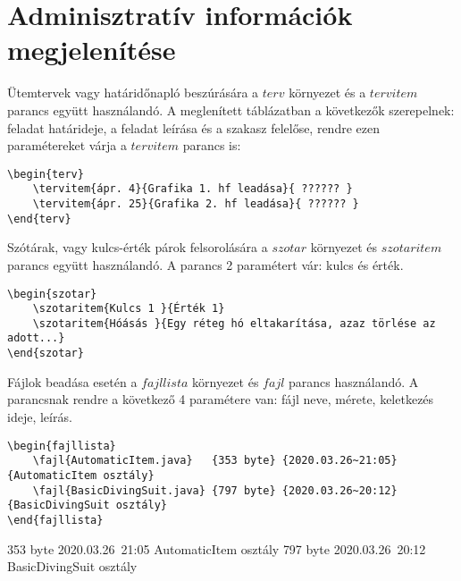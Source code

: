 \documentclass[]{article}
\begin{document}
\section{Adminisztratív információk megjelenítése}
Ütemtervek vagy határidőnapló beszúrására a $terv$ környezet és a $tervitem$ parancs együtt használandó. A meglenített táblázatban a következők szerepelnek: feladat határideje, a feladat leírása és a szakasz felelőse, rendre ezen paramétereket várja a $tervitem$ parancs is:
\begin{lstlisting}
\begin{terv}
    \tervitem{ápr. 4}{Grafika 1. hf leadása}{ ?????? }
    \tervitem{ápr. 25}{Grafika 2. hf leadása}{ ?????? }
\end{terv}
\end{lstlisting}
\begin{terv}
\end{terv}
Szótárak, vagy kulcs-érték párok felsorolására a $szotar$ környezet és $szotaritem$ parancs együtt használandó. A parancs 2 paramétert vár: kulcs és érték.
\begin{lstlisting}
\begin{szotar}
    \szotaritem{Kulcs 1 }{Érték 1}
    \szotaritem{Hóásás }{Egy réteg hó eltakarítása, azaz törlése az adott...}
\end{szotar}
\end{lstlisting}
\begin{szotar}
\end{szotar}
Fájlok beadása esetén a $fajllista$ környezet és $fajl$ parancs használandó. A parancsnak rendre a következő 4 paramétere van: fájl neve, mérete, keletkezés ideje, leírás.
\begin{lstlisting}
\begin{fajllista}
    \fajl{AutomaticItem.java}   {353 byte} {2020.03.26~21:05} {AutomaticItem osztály}
    \fajl{BasicDivingSuit.java} {797 byte} {2020.03.26~20:12} {BasicDivingSuit osztály}
\end{fajllista}
\end{lstlisting}
\begin{fajllista}
       {353 byte} {2020.03.26~21:05} {AutomaticItem osztály}
     {797 byte} {2020.03.26~20:12} {BasicDivingSuit osztály}
\end{fajllista}
\end{document}
